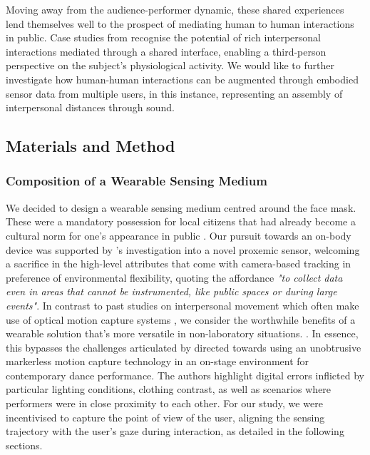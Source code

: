 Moving away from the audience-performer dynamic, these shared experiences lend themselves well to the prospect of mediating human to human interactions in public. Case studies from \citep{roo_physio-stacks_2020,howell_life-affirming_2019,ashford_eeg_2019} recognise the potential of rich interpersonal interactions mediated through a shared interface, enabling a third-person perspective on the subject’s physiological activity. We would like to further investigate how human-human interactions can be augmented through embodied sensor data from multiple users, in this instance, representing an assembly of interpersonal distances through sound.

\subsection{Materials and Method}
\label{sec3:method}

\subsubsection{Composition of a Wearable Sensing Medium}
\label{sec3.1:tech_composition}

We decided to design a wearable sensing medium centred around the face mask. These were a mandatory possession for local citizens that had already become a cultural norm for one’s appearance in public \citep{cdc_covid-19_2021}. Our pursuit towards an on-body device was supported by \citeauthor{montanari_measuring_2018}'s \citeyear{montanari_measuring_2018} investigation into a novel proxemic sensor, welcoming a sacrifice in the high-level attributes that come with camera-based tracking in preference of environmental flexibility, quoting the affordance \textit{"to collect data even in areas that cannot be instrumented, like public spaces or during large events"}. In contrast to past studies on interpersonal movement which often make use of optical motion capture systems \citep{hale_are_2020,solberg_group_2019,hamilton_seeing_2018}, we consider the worthwhile benefits of a wearable solution that's more versatile in non-laboratory situations. \citep{hale_are_2020,solberg_group_2019,hamilton_seeing_2018}. In essence, this bypasses the challenges articulated by \cite{jurgens_designing_2020} directed towards using an unobtrusive markerless motion capture technology in an on-stage environment for contemporary dance performance. The authors highlight digital errors inflicted by particular lighting conditions, clothing contrast, as well as scenarios where performers were in close proximity to each other. For our study, we were incentivised to capture the point of view of the user, aligning the sensing trajectory with the user's gaze during interaction, as detailed in the following sections.

